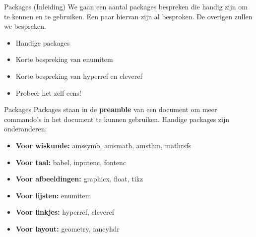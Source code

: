 \begin{frame}{Packages (Inleiding)}
	We gaan een aantal packages bespreken die handig zijn om te kennen en te gebruiken. Een paar hiervan  zijn al besproken. De overigen zullen we bespreken.
	\begin{itemize}[label=\textbullet]
		\item Handige packages
		\item Korte bespreking van enumitem
		\item Korte bespreking van hyperref en cleveref
		\item Probeer het zelf eens!
	\end{itemize}
\end{frame}

\begin{frame}{Packages}
	Packages staan in de \textbf{preamble} van een document om meer commando's in het document te kunnen gebruiken. 
	Handige packages zijn onderanderen:
	\begin{itemize}[label=\textbullet]
		\item \textbf{Voor wiskunde:} amssymb, amsmath, amsthm, mathrsfs
		\item \textbf{Voor taal:} babel, inputenc, fontenc
		\item \textbf{Voor afbeeldingen:} graphicx, float, tikz
		\item \textbf{Voor lijsten:} enumitem
		\item \textbf{Voor linkjes:} hyperref, cleveref
		\item \textbf{Voor layout:} geometry, fancyhdr
	\end{itemize}
\end{frame}

